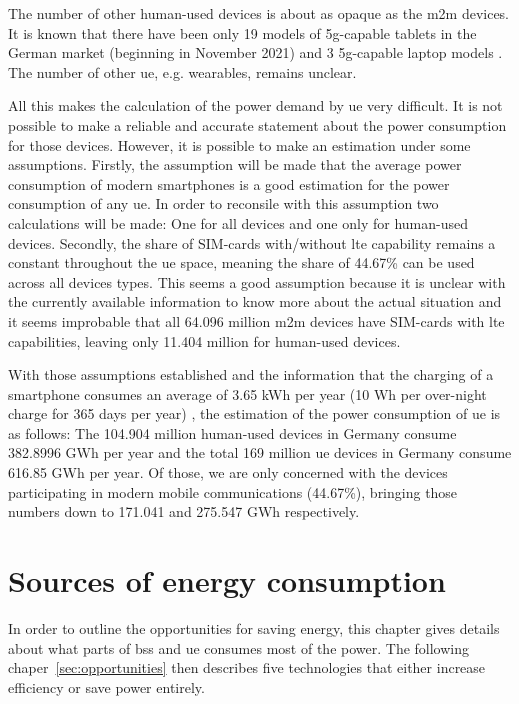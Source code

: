 \documentclass[11pt,a4paper]{article}
\begin{document}
The number of other human-used devices is about as opaque as the \acrshort{m2m} devices.
It is known that there have been only 19 models of \acrshort{5g}-capable tablets in the German market (beginning in November 2021) \citep{tabletmodels} and 3 \acrshort{5g}-capable laptop models \citep{laptopmodels}.
The number of other \acrlong{ue}, e.g. wearables, remains unclear.

All this makes the calculation of the power demand by \acrlong{ue} very difficult.
It is not possible to make a reliable and accurate statement about the power consumption for those devices.
However, it is possible to make an estimation under some assumptions.
Firstly, the assumption will be made that the average power consumption of modern smartphones is a good estimation for the power consumption of any \acrshort{ue}.
In order to reconsile with this assumption two calculations will be made: One for all devices and one only for human-used devices.
Secondly, the share of SIM-cards with/without \acrshort{lte} capability remains a constant throughout the \acrlong{ue} space, meaning the share of 44.67\% can be used across all devices types.
This seems a good assumption because it is unclear with the currently available information to know more about the actual situation and it seems improbable that all 64.096 million \acrshort{m2m} devices have SIM-cards with \acrshort{lte} capabilities, leaving only 11.404 million for human-used devices.


With those assumptions established and the information that the charging of a smartphone consumes an average of 3.65 kWh per year (10 Wh per over-night charge for 365 days per year) \citep{smartphonecharge}, the estimation of the power consumption of \acrshort{ue} is as follows:
The 104.904 million human-used devices in Germany consume 382.8996 GWh per year and the total 169 million \acrshort{ue} devices in Germany consume 616.85 GWh per year.
Of those, we are only concerned with the devices participating in modern mobile communications (44.67\%), bringing those numbers down to 171.041 and 275.547 GWh respectively.

\section{Sources of energy consumption}\label{sec:energyconsumption}
In order to outline the opportunities for saving energy, this chapter gives details about what parts of \acrlong{bs}s and \acrlong{ue} consumes most of the power.
The following chaper~\ref{sec:opportunities} then describes five technologies that either increase efficiency or save power entirely.
\end{document}
